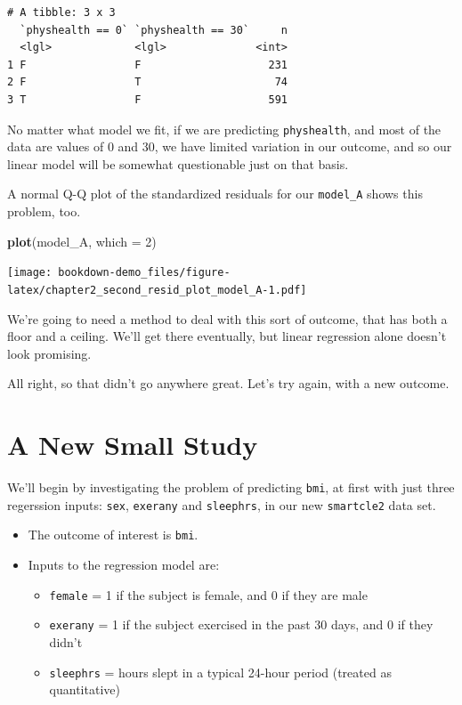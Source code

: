 \documentclass[]{book}
\newenvironment{Shaded}{\begin{snugshade}}{\end{snugshade}}
\newcommand{\KeywordTok}[1]{\textcolor[rgb]{0.13,0.29,0.53}{\textbf{#1}}}
\newcommand{\DataTypeTok}[1]{\textcolor[rgb]{0.13,0.29,0.53}{#1}}
\newcommand{\DecValTok}[1]{\textcolor[rgb]{0.00,0.00,0.81}{#1}}
\newcommand{\NormalTok}[1]{#1}
\providecommand{\tightlist}{%
  \setlength{\itemsep}{0pt}\setlength{\parskip}{0pt}}
\theoremstyle{definition}
\theoremstyle{definition}
\theoremstyle{definition}
\theoremstyle{remark}
\begin{document}
\begin{verbatim}
# A tibble: 3 x 3
  `physhealth == 0` `physhealth == 30`     n
  <lgl>             <lgl>              <int>
1 F                 F                    231
2 F                 T                     74
3 T                 F                    591
\end{verbatim}

No matter what model we fit, if we are predicting \texttt{physhealth},
and most of the data are values of 0 and 30, we have limited variation
in our outcome, and so our linear model will be somewhat questionable
just on that basis.

A normal Q-Q plot of the standardized residuals for our
\texttt{model\_A} shows this problem, too.

\begin{Shaded}
\begin{Highlighting}[]
\KeywordTok{plot}\NormalTok{(model_A, }\DataTypeTok{which =} \DecValTok{2}\NormalTok{)}
\end{Highlighting}
\end{Shaded}

\texttt{[image: bookdown-demo\_files/figure-latex/chapter2\_second\_resid\_plot\_model\_A-1.pdf]}

We're going to need a method to deal with this sort of outcome, that has
both a floor and a ceiling. We'll get there eventually, but linear
regression alone doesn't look promising.

All right, so that didn't go anywhere great. Let's try again, with a new
outcome.

\section{A New Small Study}\label{a-new-small-study}

We'll begin by investigating the problem of predicting \texttt{bmi}, at
first with just three regerssion inputs: \texttt{sex}, \texttt{exerany}
and \texttt{sleephrs}, in our new \texttt{smartcle2} data set.

\begin{itemize}
\tightlist
\item
  The outcome of interest is \texttt{bmi}.
\item
  Inputs to the regression model are:

  \begin{itemize}
  \tightlist
  \item
    \texttt{female} = 1 if the subject is female, and 0 if they are male
  \item
    \texttt{exerany} = 1 if the subject exercised in the past 30 days,
    and 0 if they didn't
  \item
    \texttt{sleephrs} = hours slept in a typical 24-hour period (treated
    as quantitative)
  \end{itemize}
\end{itemize}
\end{document}
